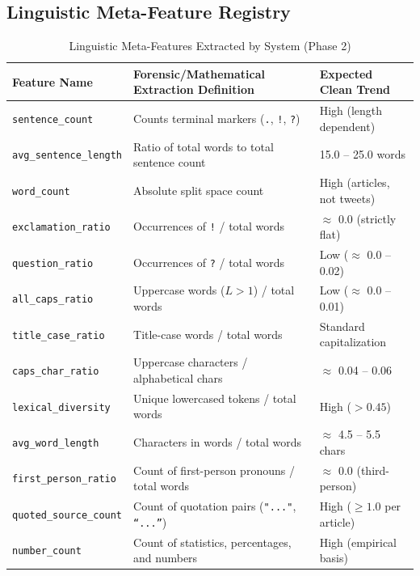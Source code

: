 \documentclass[11pt,a4paper,oneside]{article}
\begin{document}
\subsection{Linguistic Meta-Feature Registry}
\begin{table}[h]
    \centering
    \caption{Linguistic Meta-Features Extracted by System (Phase 2)}
    \label{tab:meta_features}
    \small
    \begin{tabularx}{\textwidth}{lXl}
        \toprule
        \textbf{Feature Name} & \textbf{Forensic/Mathematical Extraction Definition} & \textbf{Expected Clean Trend} \\
        \midrule
        \rowcolor{lightbg} \texttt{sentence\_count} & Counts terminal markers (\texttt{.}, \texttt{!}, \texttt{?}) & High (length dependent) \\
        \texttt{avg\_sentence\_length} & Ratio of total words to total sentence count & 15.0 -- 25.0 words \\
        \rowcolor{lightbg} \texttt{word\_count} & Absolute split space count & High (articles, not tweets) \\
        \texttt{exclamation\_ratio} & Occurrences of \texttt{!} / total words & $\approx$ 0.0 (strictly flat) \\
        \rowcolor{lightbg} \texttt{question\_ratio} & Occurrences of \texttt{?} / total words & Low ($\approx$ 0.0 -- 0.02) \\
        \texttt{all\_caps\_ratio} & Uppercase words ($L > 1$) / total words & Low ($\approx$ 0.0 -- 0.01) \\
        \rowcolor{lightbg} \texttt{title\_case\_ratio} & Title-case words / total words & Standard capitalization \\
        \texttt{caps\_char\_ratio} & Uppercase characters / alphabetical chars & $\approx$ 0.04 -- 0.06 \\
        \rowcolor{lightbg} \texttt{lexical\_diversity} & Unique lowercased tokens / total words & High ($> 0.45$) \\
        \texttt{avg\_word\_length} & Characters in words / total words & $\approx$ 4.5 -- 5.5 chars \\
        \rowcolor{lightbg} \texttt{first\_person\_ratio} & Count of first-person pronouns / total words & $\approx$ 0.0 (third-person) \\
        \texttt{quoted\_source\_count} & Count of quotation pairs (\texttt{"..."}, \texttt{“...”}) & High ($\ge 1.0$ per article) \\
        \rowcolor{lightbg} \texttt{number\_count} & Count of statistics, percentages, and numbers & High (empirical basis) \\

\end{tabularx}
\end{table}
\end{document}
